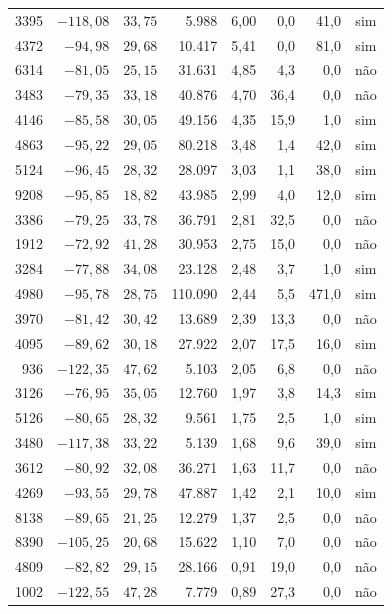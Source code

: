 {\begin{longtable}{rrrrrrrc}
		3395 & $-118{,}08$ & $33{,}75$ & 5.988 & 6,00 & 0,0 & 41,0 & sim \\
		4372 & $-94{,}98$ & $29{,}68$ & 10.417 & 5,41 & 0,0 & 81,0 & sim \\
		6314 & $-81{,}05$ & $25{,}15$ & 31.631 & 4,85 & 4,3 & 0,0 & não \\
		3483 & $-79{,}35$ & $33{,}18$ & 40.876 & 4,70 & 36,4 & 0,0 & não \\
		4146 & $-85{,}58$ & $30{,}05$ & 49.156 & 4,35 & 15,9 & 1,0 & sim \\
		4863 & $-95{,}22$ & $29{,}05$ & 80.218 & 3,48 & 1,4 & 42,0 & sim \\
		5124 & $-96{,}45$ & $28{,}32$ & 28.097 & 3,03 & 1,1 & 38,0 & sim \\
		9208 & $-95{,}85$ & $18{,}82$ & 43.985 & 2,99 & 4,0 & 12,0 & sim \\
		3386 & $-79{,}25$ & $33{,}78$ & 36.791 & 2,81 & 32,5 & 0,0 & não \\
		1912 & $-72{,}92$ & $41{,}28$ & 30.953 & 2,75 & 15,0 & 0,0 & não \\
		3284 & $-77{,}88$ & $34{,}08$ & 23.128 & 2,48 & 3,7 & 1,0 & sim \\
		4980 & $-95{,}78$ & $28{,}75$ & 110.090 & 2,44 & 5,5 & 471,0 & sim \\
		3970 & $-81{,}42$ & $30{,}42$ & 13.689 & 2,39 & 13,3 & 0,0 & não \\
		4095 & $-89{,}62$ & $30{,}18$ & 27.922 & 2,07 & 17,5 & 16,0 & sim \\
		936 & $-122{,}35$ & $47{,}62$ & 5.103 & 2,05 & 6,8 & 0,0 & não \\
		3126 & $-76{,}95$ & $35{,}05$ & 12.760 & 1,97 & 3,8 & 14,3 & sim \\
		5126 & $-80{,}65$ & $28{,}32$ & 9.561 & 1,75 & 2,5 & 1,0 & sim \\
		3480 & $-117{,}38$ & $33{,}22$ & 5.139 & 1,68 & 9,6 & 39,0 & sim \\
		3612 & $-80{,}92$ & $32{,}08$ & 36.271 & 1,63 & 11,7 & 0,0 & não \\
		4269 & $-93{,}55$ & $29{,}78$ & 47.887 & 1,42 & 2,1 & 10,0 & sim \\
		8138 & $-89{,}65$ & $21{,}25$ & 12.279 & 1,37 & 2,5 & 0,0 & não \\
		8390 & $-105{,}25$ & $20{,}68$ & 15.622 & 1,10 & 7,0 & 0,0 & não \\
		4809 & $-82{,}82$ & $29{,}15$ & 28.166 & 0,91 & 19,0 & 0,0 & não \\
		1002 & $-122{,}55$ & $47{,}28$ & 7.779 & 0,89 & 27,3 & 0,0 & não \\

\end{longtable}}
